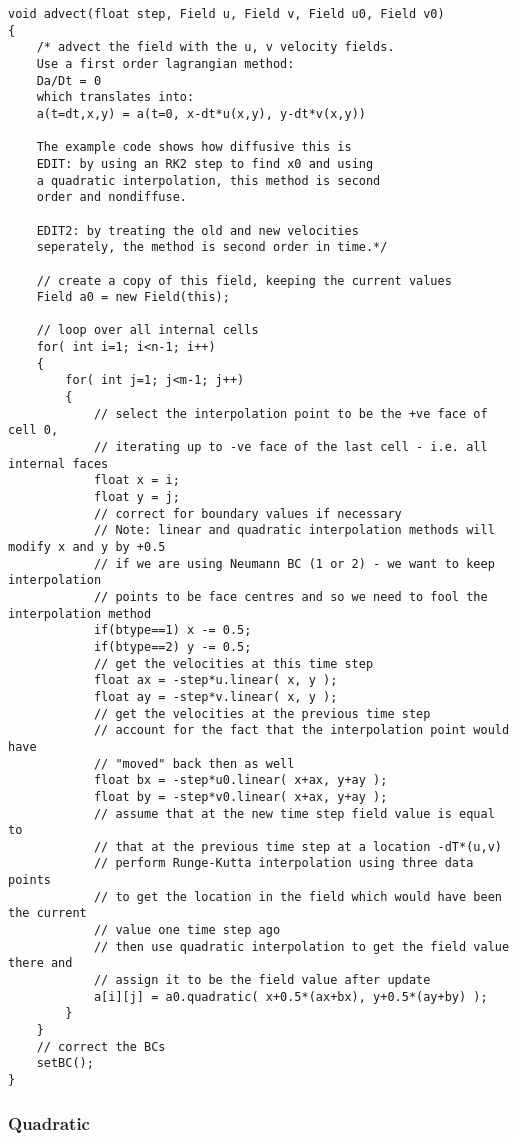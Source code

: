 \documentclass[notitlepage]{article}
\begin{document}
\begin{lstlisting}[style=myCpp]
void advect(float step, Field u, Field v, Field u0, Field v0)
{
	/* advect the field with the u, v velocity fields.
	Use a first order lagrangian method:
	Da/Dt = 0
	which translates into:
	a(t=dt,x,y) = a(t=0, x-dt*u(x,y), y-dt*v(x,y))
	
	The example code shows how diffusive this is 
	EDIT: by using an RK2 step to find x0 and using
	a quadratic interpolation, this method is second
	order and nondiffuse.
	
	EDIT2: by treating the old and new velocities 
	seperately, the method is second order in time.*/
	
	// create a copy of this field, keeping the current values
	Field a0 = new Field(this);
	
	// loop over all internal cells
	for( int i=1; i<n-1; i++)
	{
		for( int j=1; j<m-1; j++)
		{
			// select the interpolation point to be the +ve face of cell 0,
			// iterating up to -ve face of the last cell - i.e. all internal faces
			float x = i;
			float y = j;
			// correct for boundary values if necessary
			// Note: linear and quadratic interpolation methods will modify x and y by +0.5
			// if we are using Neumann BC (1 or 2) - we want to keep interpolation
			// points to be face centres and so we need to fool the interpolation method
			if(btype==1) x -= 0.5;
			if(btype==2) y -= 0.5;
			// get the velocities at this time step
			float ax = -step*u.linear( x, y );
			float ay = -step*v.linear( x, y );
			// get the velocities at the previous time step
			// account for the fact that the interpolation point would have
			// "moved" back then as well
			float bx = -step*u0.linear( x+ax, y+ay );
			float by = -step*v0.linear( x+ax, y+ay );
			// assume that at the new time step field value is equal to
			// that at the previous time step at a location -dT*(u,v)
			// perform Runge-Kutta interpolation using three data points
			// to get the location in the field which would have been the current
			// value one time step ago
			// then use quadratic interpolation to get the field value there and
			// assign it to be the field value after update
			a[i][j] = a0.quadratic( x+0.5*(ax+bx), y+0.5*(ay+by) );
		}
	}
	// correct the BCs
	setBC();
}
\end{lstlisting}

\subsubsection{Quadratic}
\end{document}
